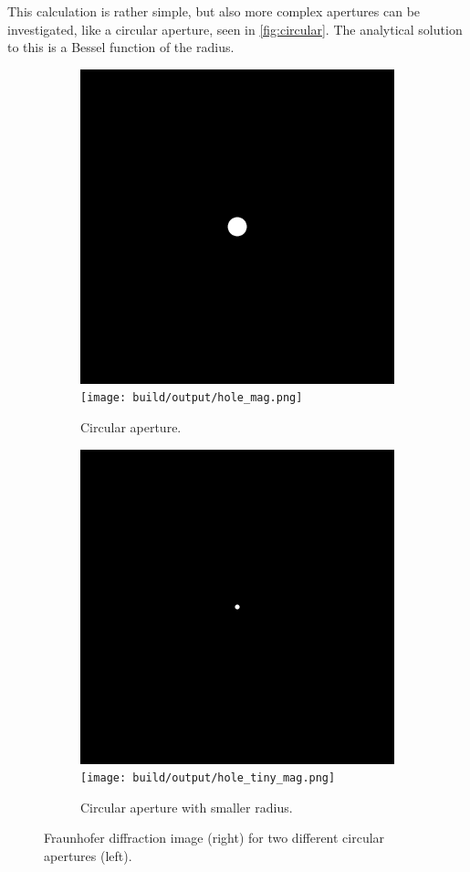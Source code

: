 This calculation is rather simple, but also more complex apertures can be investigated, like a circular
aperture, seen in \autoref{fig:circular}. The analytical solution to this is a Bessel function of the radius.

\begin{figure}[htbp]
    \centering
    \begin{subfigure}[h]{\linewidth}
        \centering
        \includegraphics[width=.49\linewidth]{images/hole.png}
        \texttt{[image: build/output/hole\_mag.png]}
        \caption{Circular aperture.}
    \end{subfigure}
    \begin{subfigure}[h]{\linewidth}
        \centering
        \includegraphics[width=.49\linewidth]{images/hole_tiny.png}
        \texttt{[image: build/output/hole\_tiny\_mag.png]}
        \caption{Circular aperture with smaller radius.}
    \end{subfigure}
    \caption{Fraunhofer diffraction image (right) for two different circular apertures (left).}
    \label{fig:circular}
\end{figure}


